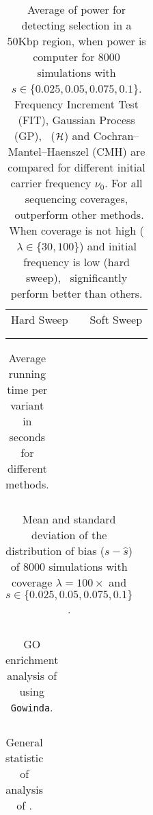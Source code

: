 \begin{table}[h]
	\centering
	\begin{tabular}{ccc}
		Hard Sweep & &Soft Sweep\\ \\  
		
		&&
	\end{tabular}
        \caption{Average of power for detecting selection in a 50Kbp region, 
        when power is computer for 8000 simulations with 
        $s\in\{0.025,0.05,0.075,0.1\}$. Frequency Increment 
        Test (FIT), Gaussian Process (GP), \comale\ (${\cal H}$) and 
        Cochran–Mantel–Haenszel (CMH) are compared for different initial 
        carrier frequency $\nu_0$. For all sequencing coverages, \comale\ 
        outperform other methods. When coverage is not high 
        ($\lambda\in\{30,100\}$) and initial frequency is low (hard sweep), 
        \comale\ significantly perform better than others.}
\label{tab:power}
\end{table}


\begin{table}[h]
	\centering
	\begin{tabular}{c}
		
	\end{tabular}
	\caption{Average running time per variant in seconds for different 
	methods.}\label{tab:times}
\end{table}

\begin{table}[h]
	\centering
	\begin{tabular}{c}
		
	\end{tabular}
	\caption{Mean and standard deviation of the distribution of bias 
	($s-\hat{s}$) of 8000 simulations with coverage $\lambda=100\times$ and 
	$s\in\{0.025,0.05,0.075,0.1\}$.}\label{tab:biasdist}
\end{table}


\begin{table}[h]
	\centering
	\begin{tabular}{c}
		
	\end{tabular}
	\caption{GO enrichment analysis of \datadm using 
	\texttt{Gowinda}.}\label{tab:gowinda}
\end{table}

\begin{table}[h]
	\centering
	\begin{tabular}{c}
		
	\end{tabular}
	\caption{General statistic of analysis of \datadm .}\label{tab:stats}
\end{table}